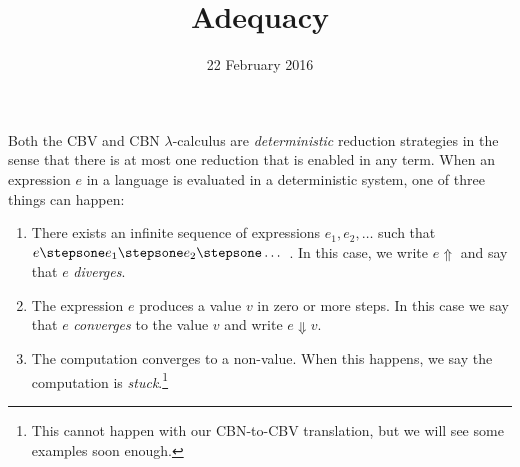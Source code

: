 \title{Adequacy}
\date{22 February 2016}
\maketitle

Both the CBV and CBN $\lambda$-calculus are \emph{deterministic} reduction strategies in the sense that there is at most one reduction that is enabled in any term. When an expression $e$ in a language is evaluated in a deterministic system, one of three things can happen:
\begin{enumerate}
\item
There exists an infinite sequence of expressions $e_1,e_2,\ldots$ such that $e\stepsone e_1\stepsone e_2\stepsone\ldots$~. In this case, we write $e\Uparrow$ and say that $e$ \emph{diverges}.
\item
The expression $e$ produces a value $v$ in zero or more steps. In this case we say that $e$ \emph{converges} to the value $v$ and write $e\Downarrow v$.
\item
The computation converges to a non-value. When this happens, we say the computation is \emph{stuck}.\footnote{This cannot happen with our CBN-to-CBV translation, but we will see some examples soon enough.}
\end{enumerate}

